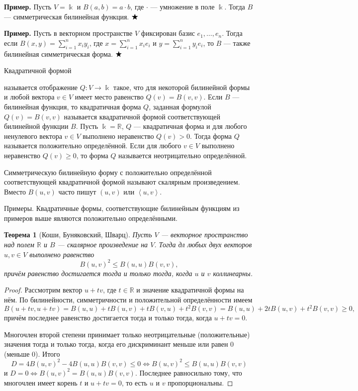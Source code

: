 \documentclass[12pt]{article}
\newtheorem{theorem}{Теорема}
\numberwithin{theorem}{section}
\theoremstyle{definition}
\newenvironment{example}{\indent \textbf{Пример.}}{$ \hfill \bigstar $}
\newcommand{\defin}[2]{\hypertarget{#2}{{\color{red} #1}}}
\newcommand{\RR}{\mathbb{R}}
\begin{document}
	\begin{example}
		Пусть $ V = \Bbbk $ и $ B(a, b) = a \cdot b $, где $ \cdot $ --- умножение в поле $ \Bbbk $.
		Тогда $ B $ --- симметрическая билинейная функция.
	\end{example}
	
	\begin{example}
		Пусть в векторном пространстве $ V $
		фиксирован базис $ e_1, \ldots, e_n $. Тогда если $ B(x, y) = \sum\limits_{i = 1}^{n} x_iy_i $, где $ x = \sum\limits_{i = 1}^{n} x_ie_i $ и $ y = \sum\limits_{i = 1}^{n} y_ie_i $, то $ B $ --- также билинейная симметрическая форма.
	\end{example}
	
	\defin{Квадратичной формой}{quadratic} называется отображение $ Q \colon V \to \Bbbk $ такое, что для некоторой билинейной формы и любой вектора $ v \in V $ имеет место равенство $ Q(v) = B(v, v) $.
	Если $ B $ --- билинейная функция, то квадратичная форма $ Q $, заданная формулой $ Q(v) = B(v, v) $
	называется квадратичной формой соответствующей билинейной функции $ B $.
	Пусть $ \Bbbk = \RR $, $ Q $ --- квадратичная форма 
	и для любого ненулевого вектора $ v \in V $ выполнено неравенство $ Q(v) > 0 $.
	Тогда форма $ Q $ называется положительно определённой. 
	Если для любого $ v \in V $ выполнено неравенство $ Q(v) \geqslant 0 $,
	то форма $ Q $ называется неотрицательно определённой.

	Симметрическую билинейную форму с положительно определённой соответствующей квадратичной формой называют 
	\defin{скалярным произведением}{inner-product}. Вместо $ B(u,v) $ часто пишут $ (u, v) $ или $ \left<u, v\right> $.
	
	Примеры. Квадратичные формы, соответствующие билинейным функциям из примеров выше являются положительно определёнными.
	
	\begin{theorem}[Коши, Буняковский, Шварц] \label{Cauchy-real}
		Пусть $ V $ --- векторное пространство над полем $ \RR $ и $ B $ --- скалярное произведение на $ V $.
		Тогда дл любых двух векторов $ u, v \in V $ выполнено равенство
		$$ B(u, v)^2 \leqslant B(u,u)B(v,v), $$
		причём равенство достигается тогда и только тогда, когда $ u $ и $ v $ коллинеарны.
	\end{theorem}
	
	\begin{proof}
		Рассмотрим вектор $ u + tv $, где $ t \in \RR $ и значение квадратичной формы на нём.
		По билинейности, симметричности и положительной определённости имеем 
		$$ B(u + tv, u + tv) = B(u, u) + tB(u, v) + tB(v, u) + t^2B(v,v) = B(u,u) + 2tB(u,v) + t^2B(v,v) \geqslant 0, $$
		причём последнее равенство достигается тогда и только тогда, когда $ u + tv = 0 $.
		
		Многочлен второй степени принимает только неотрицательные (положительные) значения тогда и только тогда, когда его дискриминант меньше или равен 0 (меньше 0).
		Итого $$ D = 4B(u,v)^2 - 4B(u,u)B(v,v) \leqslant 0  \Leftrightarrow B(u,v)^2 \leqslant B(u,u)B(v,v) $$
		и $ D = 0 \Leftrightarrow B(u,v)^2 = B(u,u)B(v,v) $. Последнее равносильно тому, что многочлен имеет корень $ t $
		и $ u + tv = 0 $, то есть $ u $ и $ v $ пропорциональны.
	\end{proof}
	
\end{document}

